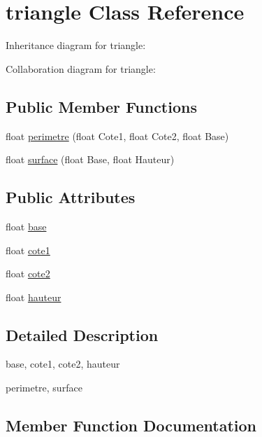 \hypertarget{classtriangle}{}\section{triangle Class Reference}
\label{classtriangle}


Inheritance diagram for triangle\+:


Collaboration diagram for triangle\+:
\subsection*{Public Member Functions}
\begin{DoxyCompactItemize}
\item 
float \hyperlink{classtriangle_a736fbf390931e18bc33cbbc59c8ee510}{perimetre} (float Cote1, float Cote2, float Base)
\item 
float \hyperlink{classtriangle_addd334e9ae2a88cb3d456d6d16d77602}{surface} (float Base, float Hauteur)
\end{DoxyCompactItemize}
\subsection*{Public Attributes}
\begin{DoxyCompactItemize}
\item 
float \hyperlink{classtriangle_a593133ae58e8fa90c431cfc60733adc5}{base}
\item 
float \hyperlink{classtriangle_a2263101dafa40aa6c3b7beb79e93f9d3}{cote1}
\item 
float \hyperlink{classtriangle_a41540d6c2e1bcb076b93ca83fc1032a3}{cote2}
\item 
float \hyperlink{classtriangle_ae42cf8cc51203613bb6e2f6d5628763c}{hauteur}
\end{DoxyCompactItemize}


\subsection{Detailed Description}
base, cote1, cote2, hauteur

perimetre, surface 

\subsection{Member Function Documentation}
\mbox{\label{classtriangle_a736fbf390931e18bc33cbbc59c8ee510}} 
